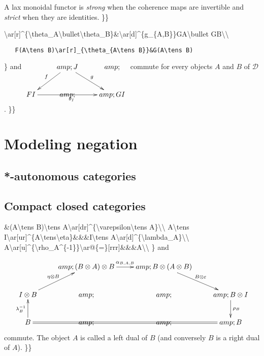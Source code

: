 A lax monoidal functor is \emph{strong} when the coherence maps are
invertible and \emph{strict} when they are identities. \}\}

\textbackslash{}ar{[}r{]}\^{}\{\textbackslash{}theta\_A\textbackslash{}bullet\textbackslash{}theta\_B\}\&\textbackslash{}ar{[}d{]}\^{}\{g\_\{A,B\}\}GA\textbackslash{}bullet
GB\textbackslash{}\textbackslash{}

\texttt{~~~F(A\textbackslash{}tens~B)\textbackslash{}ar{[}r{]}\_\{\textbackslash{}theta\_\{A\textbackslash{}tens~B\}\}\&G(A\textbackslash{}tens~B)}

\} and \(\xymatrix{
  &amp;\ar[dl]_{f}J\ar[dr]^{g}&amp;\\
  FI\ar[rr]_{\theta_I}&amp;&amp;GI
}\) commute for every objects \(A\) and \(B\) of \(\mathcal{D}\). \}\}

\section{Modeling negation}\label{modeling-negation}

\subsection{*-autonomous categories}\label{autonomous-categories}

\subsection{Compact closed categories}\label{compact-closed-categories}

\&(A\textbackslash{}tens B)\textbackslash{}tens
A\textbackslash{}ar{[}dr{]}\^{}\{\textbackslash{}varepsilon\textbackslash{}tens
A\}\textbackslash{}\textbackslash{} A\textbackslash{}tens
I\textbackslash{}ar{[}ur{]}\^{}\{A\textbackslash{}tens\textbackslash{}eta\}\&\&\&I\textbackslash{}tens
A\textbackslash{}ar{[}d{]}\^{}\{\textbackslash{}lambda\_A\}\textbackslash{}\textbackslash{}
A\textbackslash{}ar{[}u{]}\^{}\{\textbackslash{}rho\_A\^{}\{-1\}\}\textbackslash{}ar@\{=\}{[}rrr{]}\&\&\&A\textbackslash{}\textbackslash{}
\} and

\[\xymatrix{
&amp;(B\tens A)\tens B\ar[r]^{\alpha_{B,A,B}}&amp;B\tens(A\tens B)\ar[dr]^{B\tens\varepsilon}\\
I\tens B\ar[ur]^{\eta\tens B}&amp;&amp;&amp;B\tens I\ar[d]^{\rho_B}\\
B\ar[u]^{\lambda_B^{-1}}\ar@{=}[rrr]&amp;&amp;&amp;B\\
}\] commute. The object \(A\) is called a left dual of \(B\) (and
conversely \(B\) is a right dual of \(A\)). \}\}

